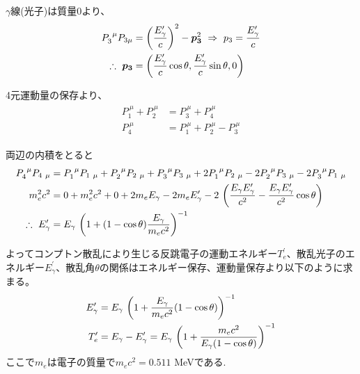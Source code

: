 \documentclass[../../main.tex]{subfiles}
\numberwithin{equation}{section}
\numberwithin{table}{section}
\numberwithin{figure}{section}
\begin{document}
$\gamma$線(光子)は質量0より、
\begin{align}
\begin{split}
P^{\ \mu}_3P_{3\mu}&=\qty(\frac{E_{\gamma}^{\prime}}{c})^2-\bm{p_3}^2\ \Rightarrow\ p_3=\frac{E_{\gamma}^{\prime}}{c}\\
\therefore\ \bm{p_3}&=\qty(\frac{E_{\gamma}^{\prime}}{c}\cos\theta,\frac{E_{\gamma}^{\prime}}{c}\sin\theta,0)
\end{split}
\end{align}

4元運動量の保存より、
\begin{align}
\begin{split}
P^{\ \mu}_1+P^{\ \mu}_2&=P^{\ \mu}_3+P^{\ \mu}_4\\
P^{\ \mu}_4&=P^{\ \mu}_1+P^{\ \mu}_2-P^{\ \mu}_3
\end{split}
\end{align}

両辺の内積をとると
\begin{align}
\begin{split}
P^{\ \mu}_4P_{4\ \mu}&=P^{\ \mu}_1P_{1\ \mu}+P^{\ \mu}_2P_{2\ \mu}+P^{\ \mu}_3P_{3\ \mu}+2P^{\ \mu}_1P_{2\ \mu}-2P^{\ \mu}_2P_{3\ \mu}-2P^{\ \mu}_3P_{1\ \mu}\\
m_e^2c^2&=0+m_e^2c^2+0+2m_eE_{\gamma}-2m_eE_{\gamma}^{\prime}-2\ \qty(\frac{E_{\gamma}E_{\gamma}^{\prime}}{c^2}-\frac{E_{\gamma}E_{\gamma}^{\prime}}{c^2}\cos\theta)\\
\therefore\ E_{\gamma}^{\prime}&=E_{\gamma}\ \qty(1+(1-\cos\theta)\frac{E_{\gamma}}{m_ec^2})^{-1}
\end{split}
\end{align}

よってコンプトン散乱により生じる反跳電子の運動エネルギー$T_e^{\prime}$、散乱光子のエネルギー$E_{\gamma}^{\prime}$、散乱角$\theta$の関係はエネルギー保存、運動量保存より以下のように求まる。
\begin{align}
E_{\gamma}^{\prime}&=E_{\gamma}\ \qty(1+\frac{E_{\gamma}}{m_ec^2}(1-\cos\theta))^{-1} \label{eq:Egamma}\\
T_e^{\prime}&=E_{\gamma}-E_{\gamma}^{\prime}=E_{\gamma}\ \qty(1+\frac{m_ec^2}{E_{\gamma}(1-\cos\theta)})^{-1} \label{T_e}
\end{align}
ここで$m_e$は電子の質量で$m_ec^2=0.511$ MeVである. 


\end{document}
